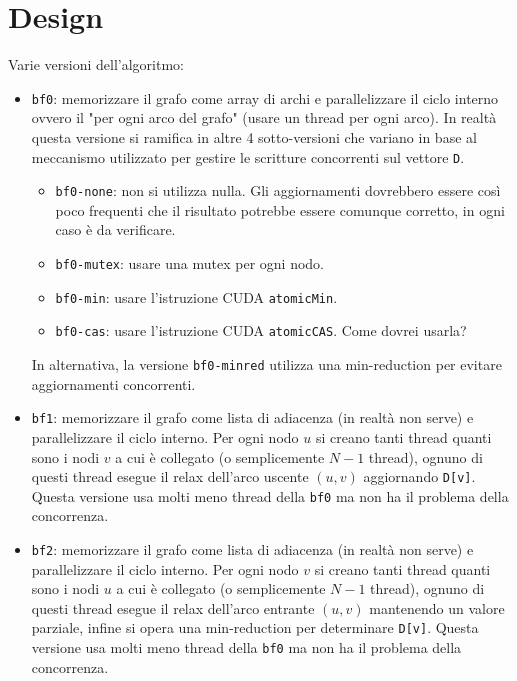 \documentclass{article}
\begin{document}
	\section{Design}
	Varie versioni dell'algoritmo:
	\begin{itemize}
		\item \texttt{bf0}: memorizzare il grafo come array di archi e parallelizzare il ciclo interno ovvero il "per ogni arco del grafo" (usare un thread per ogni arco). In realtà questa versione si ramifica in altre 4 sotto-versioni che variano in base al meccanismo utilizzato per gestire le scritture concorrenti sul vettore \texttt{D}.
		\begin{itemize}
			\item \texttt{bf0-none}: non si utilizza nulla. Gli aggiornamenti dovrebbero essere così poco frequenti che il risultato potrebbe essere comunque corretto, in ogni caso è da verificare.
			\item \texttt{bf0-mutex}: usare una mutex per ogni nodo.
			\item \texttt{bf0-min}: usare l'istruzione CUDA \texttt{atomicMin}.
			\item \texttt{bf0-cas}: usare l'istruzione CUDA \texttt{atomicCAS}. Come dovrei usarla?
		\end{itemize}
		In alternativa, la versione \texttt{bf0-minred} utilizza una min-reduction per evitare aggiornamenti concorrenti.
	
		\item \texttt{bf1}: memorizzare il grafo come lista di adiacenza (in realtà non serve) e parallelizzare il ciclo interno. Per ogni nodo $u$ si creano tanti thread quanti sono i nodi $v$ a cui è collegato (o semplicemente $N-1$ thread), ognuno di questi thread esegue il relax dell'arco uscente $(u,v)$ aggiornando \texttt{D[v]}. Questa versione usa molti meno thread della \texttt{bf0} ma non ha il problema della concorrenza.
		
		\item \texttt{bf2}: memorizzare il grafo come lista di adiacenza (in realtà non serve) e parallelizzare il ciclo interno. Per ogni nodo $v$ si creano tanti thread quanti sono i nodi $u$ a cui è collegato (o semplicemente $N-1$ thread), ognuno di questi thread esegue il relax dell'arco entrante $(u,v)$ mantenendo un valore parziale, infine si opera una min-reduction per determinare \texttt{D[v]}. Questa versione usa molti meno thread della \texttt{bf0} ma non ha il problema della concorrenza.
	\end{itemize}
\end{document}
